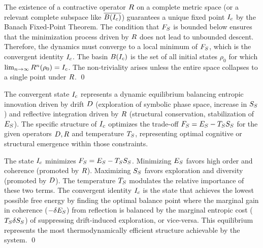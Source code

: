\begin{demonstratio}
\label{demonstratio:bk7_banach_convergence_reflection}
The existence of a contractive operator \(R\) on a complete metric space (or a relevant complete subspace like \(\overline{B(I_c)}\)) guarantees a unique fixed point \(I_c\) by the Banach Fixed-Point Theorem. The condition that \(F_S\) is bounded below ensures that the minimization process driven by \(R\) does not lead to unbounded descent. Therefore, the dynamics must converge to a local minimum of \(F_S\), which is the convergent identity \(I_c\). The basin \(B(I_c)\) is the set of all initial states \(\rho_0\) for which \(\lim_{n\to\infty} R^n(\rho_0) = I_c\). The non-triviality arises unless the entire space collapses to a single point under \(R\). \qed
\end{demonstratio}
\begin{corollary}
\label{corollary:bk7_stability_innovation_equilibrium}
The convergent state \(I_c\) represents a dynamic equilibrium balancing entropic innovation driven by drift \(D\) (exploration of symbolic phase space, increase in \(S_S\)) and reflective integration driven by \(R\) (structural conservation, stabilization of \(E_S\)). The specific structure of \(I_c\) optimizes the trade-off \(F_S = E_S - T_S S_S\) for the given operators \(D, R\) and temperature \(T_S\), representing optimal cognitive or structural emergence within those constraints.
\end{corollary}
\begin{demonstratio}
\label{demonstratio:bk7_free_energy_balance_equilibrium}
The state \(I_c\) minimizes \(F_S = E_S - T_S S_S\). Minimizing \(E_S\) favors high order and coherence (promoted by \(R\)). Maximizing \(S_S\) favors exploration and diversity (promoted by \(D\)). The temperature \(T_S\) modulates the relative importance of these two terms. The convergent identity \(I_c\) is the state that achieves the lowest possible free energy by finding the optimal balance point where the marginal gain in coherence (\(-\delta E_S\)) from reflection is balanced by the marginal entropic cost (\(T_S \delta S_S\)) of suppressing drift-induced exploration, or vice-versa. This equilibrium represents the most thermodynamically efficient structure achievable by the system. \qed
\end{demonstratio}
